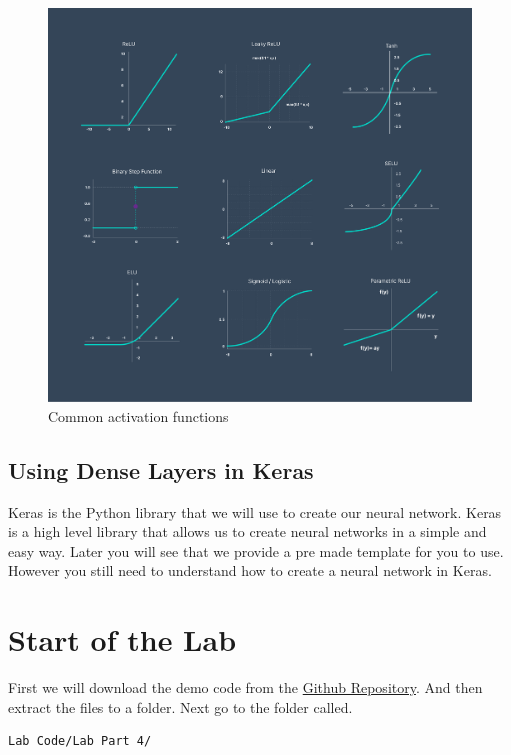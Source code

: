 \documentclass[11pt]{report}
\begin{document}
\begin{figure}
    \begin{center}
    \includegraphics[width=1\textwidth]{activation functions.png}
    \caption{Common activation functions}
    \label{fig:activation_functions}
    \end{center}
\end{figure}

\section{Using Dense Layers in Keras}
Keras is the Python library that we will use to create our neural network. Keras is a high level library that allows us to create neural networks in a simple and easy way. Later you will see that we provide a pre made template for you to use. However you still need to understand how to create a neural network in Keras.

\pagebreak





\chapter{Start of the Lab}
First we will download the demo code from the \href{https://github.com/PiCarV/Demos/archive/refs/heads/main.zip}{Github Repository}. And then extract the files to a folder. Next go to the folder called.
\begin{verbatim} 
Lab Code/Lab Part 4/
\end{verbatim}
\end{document}
